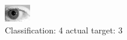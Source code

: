 \begin{figure}[h!]
\begin{center}
\includegraphics[width=0.60\columnwidth]{figures/ID198_class_4_target_3.png}
\end{center}
\caption{ Classification: 4 actual target: 3}
\label{fig:ID198_class_4_target_3}
\end{figure}
